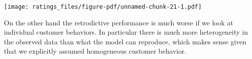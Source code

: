 \documentclass[
  letterpaper,
  DIV=11,
  numbers=noendperiod]{scrartcl}
\newenvironment{Shaded}{\begin{snugshade}}{\end{snugshade}}
\newcommand{\AttributeTok}[1]{\textcolor[rgb]{0.40,0.45,0.13}{#1}}
\newcommand{\DecValTok}[1]{\textcolor[rgb]{0.68,0.00,0.00}{#1}}
\newcommand{\FloatTok}[1]{\textcolor[rgb]{0.68,0.00,0.00}{#1}}
\newcommand{\FunctionTok}[1]{\textcolor[rgb]{0.28,0.35,0.67}{#1}}
\newcommand{\NormalTok}[1]{\textcolor[rgb]{0.00,0.23,0.31}{#1}}
\newcommand{\SpecialCharTok}[1]{\textcolor[rgb]{0.37,0.37,0.37}{#1}}
\newcommand{\StringTok}[1]{\textcolor[rgb]{0.13,0.47,0.30}{#1}}
\begin{document}
\begin{Shaded}
\end{Shaded}

\texttt{[image: ratings\_files/figure-pdf/unnamed-chunk-21-1.pdf]}

On the other hand the retrodictive performance is much worse if we look
at individual customer behaviors. In particular there is much more
heterogeneity in the observed data than what the model can reproduce,
which makes sense given that we explicitly assumed homogeneous customer
behavior.
\end{document}
